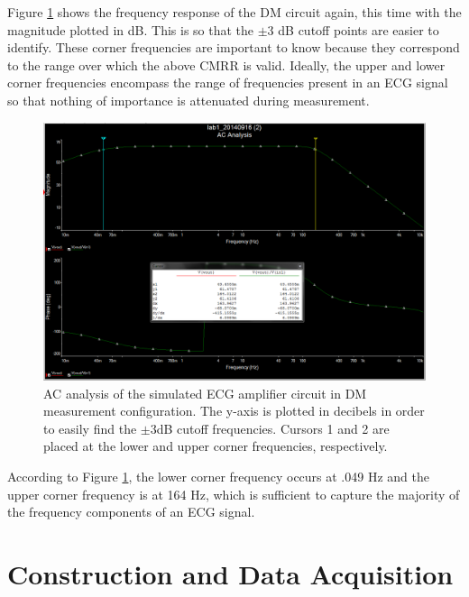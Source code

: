 \documentclass[pdftex,12pt,letterpaper]{article}
\begin{document}
Figure \ref{fig:3DB} shows the frequency response of the DM circuit again, this time with the magnitude plotted in dB. This is so that the $\pm$3 dB cutoff points are easier to identify. These corner frequencies are important to know because they correspond to the range over which the above CMRR is valid. Ideally, the upper and lower corner frequencies encompass the range of frequencies present in an ECG signal so that nothing of importance is attenuated during measurement.
\begin{figure}[H]
\begin{center}
\includegraphics[scale=.35]{3db_analysis.png}
\caption{AC analysis of the simulated ECG amplifier circuit in DM measurement configuration. The y-axis is plotted in decibels in order to easily find the $\pm$3dB cutoff frequencies. Cursors 1  and 2 are placed at the lower and upper corner frequencies, respectively.}
\label{fig:3DB}
\end{center}
\end{figure}
According to Figure \ref{fig:3DB}, the lower corner frequency occurs at .049 Hz and the upper corner frequency is at 164 Hz, which is sufficient to capture the majority of the frequency components of an ECG signal.

\section{Construction and Data Acquisition}
\end{document}
